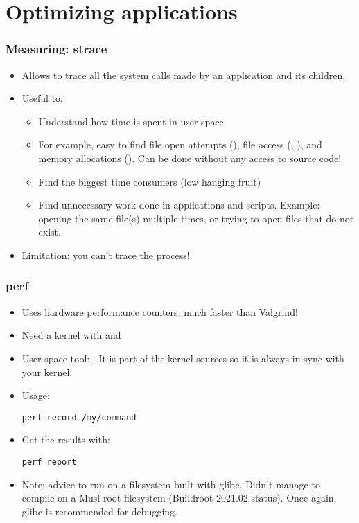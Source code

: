 \section{Optimizing applications}

\begin{frame}
\frametitle{Measuring: strace}
\begin{itemize}
	\item Allows to trace all the system calls made by an
              application and its children.
	\item Useful to:
	\begin{itemize}
		\item Understand how time is spent in user space
		\item For example, easy to find file open attempts (),
		      file access (, ), and
		      memory allocations (). Can be done
		      without any access to source code!
		\item Find the biggest time consumers
		      (low hanging fruit)
		\item Find unnecessary work done in applications
		      and scripts. Example: opening the same file(s)
		      multiple times, or trying to open files that
		      do not exist.
	\end{itemize}
	\item Limitation: you can't trace the  process!
\end{itemize}
\end{frame}





\begin{frame}[fragile]
\frametitle{perf}
\begin{itemize}
	\item Uses hardware performance counters, much faster than Valgrind!
	\item Need a kernel with  and 
	\item User space tool: . It is part of the kernel
		sources so it is always in sync with your kernel.
	\item Usage:
	\begin{block}{}
\begin{verbatim}
perf record /my/command
\end{verbatim}
	\end{block}
	\item Get the results with:
	\begin{block}{}
\begin{verbatim}
perf report
\end{verbatim}
	\end{block}
        \item Note: advice to run  on a filesystem built with
              glibc. Didn't manage to compile  on a Musl
              root filesystem (Buildroot 2021.02 status). Once again, glibc is
              recommended for debugging.
\end{itemize}
\end{frame}

